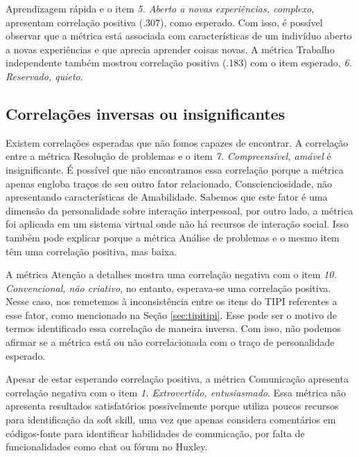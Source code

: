 Aprendizagem rápida e o item \textit{5. Aberto a novas experiências, complexo}, apresentam correlação positiva (.307), como esperado. Com isso, é possível observar que a métrica está associada com características de um indivíduo aberto a novas experiências e que aprecia aprender coisas novas. A métrica Trabalho independente também mostrou correlação positiva (.183) com o item esperado, \textit{6. Reservado, quieto}.

\subsection{Correlações inversas ou insignificantes}

Existem correlações esperadas que não fomos capazes de encontrar. A correlação entre a métrica Resolução de problemas e o item \textit{7. Compreensível, amável} é insignificante. É possível que não encontramos essa correlação porque a métrica apenas engloba traços de seu outro fator relacionado, Conscienciosidade, não apresentando características de Amabilidade. Sabemos que este fator é uma dimensão da personalidade sobre interação interpessoal, por outro lado, a métrica foi aplicada em um sistema virtual onde não há recursos de interação social. Isso também pode explicar porque a métrica Análise de problemas e o mesmo item têm uma correlação positiva, mas baixa.

A métrica Atenção a detalhes mostra uma correlação negativa com o item
\textit{10. Convencional, não criativo}, no entanto, esperava-se uma correlação positiva.
Nesse caso, nos remetemos à inconsistência entre os itens do TIPI referentes a esse fator, como mencionado na Seção \ref{sec:tipitipi}.
Esse pode ser o motivo de termos identificado essa correlação de maneira inversa.
Com isso, não podemos afirmar se a métrica está ou não correlacionada com o traço de personalidade esperado.

Apesar de estar esperando correlação positiva, a métrica Comunicação apresenta correlação negativa com o item \textit{1. Extrovertido, entusiasmado}.
Essa métrica não apresenta resultados satisfatórios possivelmente porque utiliza poucos recursos para identificação da soft skill,
uma vez que apenas considera comentários em códigos-fonte para identificar habilidades de comunicação,
por falta de funcionalidades como chat ou fórum no Huxley.

